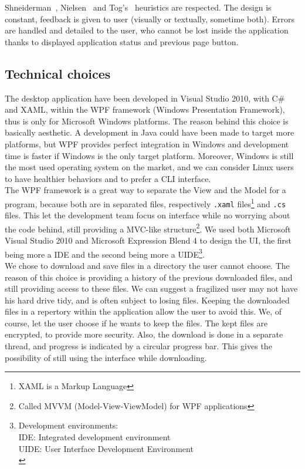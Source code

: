 \documentclass[a4paper,12pt, twocolumn]{article}
\begin{document}
Shneiderman~\cite{shneiderman05}, Nielsen~\cite{nielsen94} and Tog's~\cite{tognazzini03} heuristics are respected. The design is constant, feedback is given to user (visually or textually, sometime both). Errors are handled and detailed to the user, who cannot be lost inside the application thanks to displayed application status and previous page button.

\subsection*{Technical choices}

The desktop application have been developed in Visual Studio 2010, with C\# and XAML, within the WPF framework (Windows Presentation Framework), thus is only for Microsoft Windows platforms. The reason behind this choice is basically aesthetic. A development in Java could have been made to target more platforms, but WPF provides perfect integration in Windows and development time is faster if Windows is the only target platform. Moreover, Windows is still the most used operating system on the market, and we can consider Linux users to have healthier behaviors and to prefer a CLI interface.\\

The WPF framework is a great way to separate the View and the Model for a program, because both are in separated files, respectively \verb$.xaml$ files\footnote{XAML is a Markup Language} and \verb$.cs$ files. This let the development team focus on interface while no worrying about the code behind, still providing a MVC-like structure\footnote{Called MVVM (Model-View-ViewModel) for WPF applications}. We used both Microsoft Visual Studio 2010 and Microsoft Expression Blend 4 to design the UI, the first being more a IDE and the second being more a UIDE\footnote{Development environments:\\IDE: Integrated development environment\\UIDE: User Interface Development Environment\\}.\\

We chose to download and save files in a directory the user cannot choose. The reason of this choice is providing a history of the previous downloaded files, and still providing access to these files. We can suggest a fragilized user may not have his hard drive tidy, and is often subject to losing files. Keeping the downloaded files in a repertory within the application allow the user to avoid this. We, of course, let the user choose if he wants to keep the files. The kept files are encrypted, to provide more security. Also, the download is done in a separate thread, and progress is indicated by a circular progress bar. This gives the possibility of still using the interface while downloading.
\end{document}
